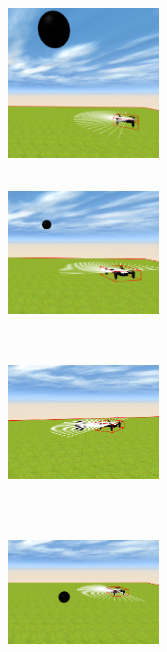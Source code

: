 \begin{figure}[H]
\begin{subfigure}[t]{0.3\textwidth}
  \includegraphics[width=4cm, height=4cm]{img/followBallTello12.png}
\label{fig:figure2_2}
\end{subfigure}\hfill
\begin{subfigure}[t]{0.3\textwidth}
    \includegraphics[width=4cm, height=4cm]{img/followBallTello22.png}
\label{fig:figure2_3}
\end{subfigure}\hfill
\begin{subfigure}[t]{0.3\textwidth}
    \includegraphics[width=4cm, height=4cm]{img/followBallTello32.png}
\label{fig:figure2_4}
\end{subfigure}
\begin{subfigure}[t]{0.3\textwidth}
    \includegraphics[width=4cm, height=4cm]{img/followBallTello42.png}
\label{fig:figure2_6}

\end{subfigure}
\end{figure}
